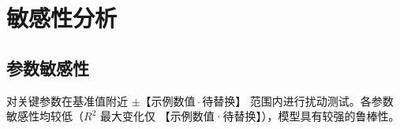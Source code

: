 \section{敏感性分析}

\subsection{参数敏感性}

对关键参数在基准值附近 $\pm 【示例数值·待替换】$ 范围内进行扰动测试。各参数敏感性均较低（$R^2$ 最大变化仅 【示例数值·待替换】），模型具有较强的鲁棒性。
